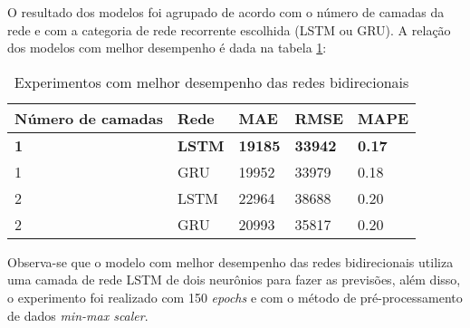 O resultado dos modelos foi agrupado de acordo com o número de camadas da 
rede e com a categoria de rede recorrente escolhida (LSTM ou GRU). A relação dos modelos com 
melhor desempenho é dada na tabela \ref{tab:res-bi}:

\begin{table}[H]
    \centering
    \caption{Experimentos com melhor desempenho das redes bidirecionais}
    \begin{tabular}{lllll}
    \toprule
    Número de camadas & Rede & MAE & RMSE & MAPE \\
    \midrule
    \textbf{1} & \textbf{LSTM} & \textbf{19185}  & \textbf{33942} & \textbf{0.17}\\
    1 & GRU  & 19952  & 33979  & 0.18 \\
    2 & LSTM & 22964  & 38688 & 0.20  \\
    2 & GRU  & 20993  & 35817  & 0.20 \\
    \bottomrule
    \end{tabular}
    \label{tab:res-bi}
\end{table}

Observa-se que o modelo com melhor desempenho das redes bidirecionais 
utiliza uma camada de rede LSTM de dois neurônios para fazer as previsões, além disso, o experimento foi 
realizado com 150 \textit{epochs} e com o método de pré-processamento de dados 
\textit{min-max scaler}.